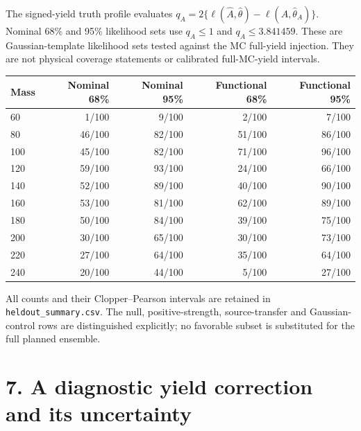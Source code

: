 \documentclass[10pt]{article}
\newcommand{\Ah}{\widehat A}\newcommand{\sh}{\widehat\sigma}
\begin{document}
The signed-yield truth profile evaluates $q_A=2\{\ell(\Ah,\widehat\theta)-\ell(A,\widehat\theta_A)\}$. Nominal 68\% and 95\% likelihood sets use $q_A\le1$ and $q_A\le3.841459$. These are Gaussian-template likelihood sets tested against the MC full-yield injection. They are not physical coverage statements or calibrated full-MC-yield intervals.
\begin{center}\small\begin{tabular}{lrrrr}\toprule
Mass & Nominal 68\% & Nominal 95\% & Functional 68\% & Functional 95\%\\\midrule
60 & 1/100 & 9/100 & 2/100 & 7/100\\
80 & 46/100 & 82/100 & 51/100 & 86/100\\
100 & 45/100 & 82/100 & 71/100 & 96/100\\
120 & 59/100 & 93/100 & 24/100 & 66/100\\
140 & 52/100 & 89/100 & 40/100 & 90/100\\
160 & 53/100 & 81/100 & 62/100 & 89/100\\
180 & 50/100 & 84/100 & 39/100 & 75/100\\
200 & 30/100 & 65/100 & 30/100 & 73/100\\
220 & 27/100 & 64/100 & 35/100 & 64/100\\
240 & 20/100 & 44/100 & 5/100 & 27/100\\
\bottomrule\end{tabular}\end{center}All counts and their Clopper--Pearson intervals are retained in \texttt{heldout\_summary.csv}. The null, positive-strength, source-transfer and Gaussian-control rows are distinguished explicitly; no favorable subset is substituted for the full planned ensemble.\clearpage\section*{7. A diagnostic yield correction and its uncertainty}
\end{document}
